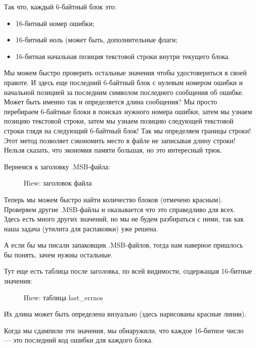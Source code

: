 Так что, каждый 6-байтный блок это:

\begin{itemize}
\item 16-битный номер ошибки; 
\item 16-битный ноль (может быть, дополнительные флаги; 
\item 16-битная начальная позиция текстовой строки внутри текущего блока.
\end{itemize}

Мы можем быстро проверить остальные значения чтобы удостовериться в своей правоте.
И здесь еще последний  6-байтный блок с нулевым номером ошибки и начальной позицией за последним
символом последнего сообщения об ошибке.
Может быть именно так и определяется длина сообщения?
Мы просто перебираем 6-байтные блоки в поисках нужного номера ошибки, затем
мы узнаем позицию текстовой строки, затем мы узнаем позицию следующей текстовой строки глядя на
следующий 6-байтный блок!
Так мы определяем границы строки!
Этот метод позволяет сэкономить место в файле не записывая длину строки!
Нельзя сказать, что экономия памяти большая, но это интересный трюк.

\clearpage
Вернемся к заголовку .MSB-файла:

\begin{figure}[H]
\centering
{}
\caption{Hiew: заголовок файла}
\label{fig:oracle_MSB_3}
\end{figure}

Теперь мы можем быстро найти количество блоков (отмечено красным).
Проверяем другие .MSB-файлы и оказывается что это справедливо для всех.
Здесь есть много других значений, но мы не будем разбираться с ними, так как наша задача (утилита для распаковки) уже решена.

А если бы мы писали запаковщик .MSB-файлов, тогда нам наверное пришлось бы понять, зачем нужны остальные.

\clearpage
Тут еще есть таблица после заголовка, по всей видимости, содержащая 16-битные значения:

\begin{figure}[H]
\centering
{}
\caption{Hiew: таблица last\_errnos}
\label{fig:oracle_MSB_4}
\end{figure}

Их длина может быть определена визуально (здесь нарисованы красные линии).

Когда мы сдампили эти значения, мы обнаружили, что каждое 16-битное число --- это последний код ошибки для каждого блока.%

